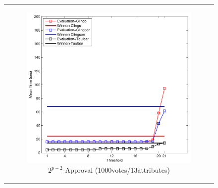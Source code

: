 
\begin{figure}[!ht]
	\centering
	\setlength{\tabcolsep}{0mm}
	\begin{tabular}{c}
  \begin{subfigure}[b]{0.5\textwidth}
		\includegraphics[width=\textwidth]{figs/expAppMSCICP_1000v_13i.pdf}
		\caption{$2^{p-2}$-Approval (1000votes/13attributes)}
		\label{fig:comparison:eval:1}
	\end{subfigure}
  \begin{subfigure}[b]{0.5\textwidth}

\end{subfigure}
\end{tabular}
\end{figure}
